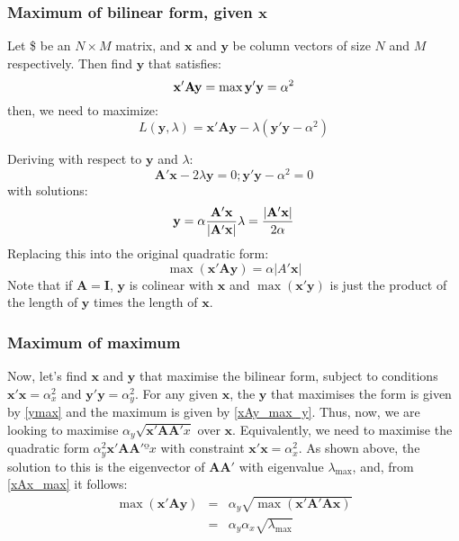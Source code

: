 \documentclass[
]{article}
\begin{document}
\hypertarget{maximum-of-bilinear-form-given-mathbfx}{%
\subsubsection{\texorpdfstring{Maximum of bilinear form, given
\(\mathbf{x}\)}{Maximum of bilinear form, given \textbackslash mathbf\{x\}}}\label{maximum-of-bilinear-form-given-mathbfx}}

Let \$ be an \(N \times M\) matrix, and \(\mathbf{x}\) and
\(\mathbf{y}\) be column vectors of size \(N\) and \(M\) respectively.
Then find \(\mathbf{y}\) that satisfies: \[
\mathbf{x}'\mathbf{A}\mathbf{y}=\max \\
\mathbf{y}'\mathbf{y}= \alpha^2
\] then, we need to maximize: \[
L(\mathbf{y},\lambda) = \mathbf{x}'\mathbf{A}\mathbf{y}- \lambda (\mathbf{y}'\mathbf{y}-\alpha^2)
\]

Deriving with respect to \(\mathbf{y}\) and \(\lambda\): \[
\mathbf{A}'\mathbf{x}- 2\lambda\mathbf{y}= 0; \mathbf{y}'\mathbf{y}-\alpha^2=0
\] with solutions: \[
\mathbf{y}= \alpha \frac{\mathbf{A}'\mathbf{x}}{|\mathbf{A}'\mathbf{x}|}\\ %
\lambda =\frac{|\mathbf{A}' \mathbf{x}|}{2\alpha}
\] Replacing this into the original quadratic form: \[
\max(\mathbf{x}'\mathbf{A}\mathbf{y}) = \alpha |A'\mathbf{x}| \label{xAy_max_y}
\] Note that if \(\mathbf{A}= \mathbf{I}\), \(\mathbf{y}\) is colinear
with \(\mathbf{x}\) and \(\max(\mathbf{x}'\mathbf{y})\) is just the
product of the length of \(\mathbf{y}\) times the length of
\(\mathbf{x}\).

\hypertarget{maximum-of-maximum}{%
\subsubsection{Maximum of maximum}\label{maximum-of-maximum}}

Now, let's find \(\mathbf{x}\) and \(\mathbf{y}\) that maximise the
bilinear form, subject to conditions
\(\mathbf{x}'\mathbf{x}= \alpha_x^2\) and
\(\mathbf{y}'\mathbf{y}= \alpha_y^2\). For any given \(\mathbf{x}\), the
\(\mathbf{y}\) that maximises the form is given by \eqref{ymax} and the
maximum is given by \eqref{xAy_max_y}. Thus, now, we are looking to
maximise \(\alpha_y \sqrt{\mathbf{x}' \mathbf{A}\mathbf{A}' x}\) over
\(\mathbf{x}\). Equivalently, we need to maximise the quadratic form
\(\alpha_y^2 \mathbf{x}' \mathbf{A}\mathbf{A}'º x\) with constraint
\(\mathbf{x}'\mathbf{x}= \alpha_x^2\). As shown above, the solution to
this is the eigenvector of \(\mathbf{A}\mathbf{A}'\) with eigenvalue
\(\lambda_\max\), and, from \eqref{xAx_max} it follows: \[
\begin{eqnarray}
\max(\mathbf{x}' \mathbf{A}\mathbf{y}) & = & \alpha_y \sqrt{\max(\mathbf{x}'\mathbf{A}'\mathbf{A}\mathbf{x})} \\
& = & \alpha_y \alpha_x \sqrt{\lambda_\max}
\end{eqnarray}
\]
\end{document}
